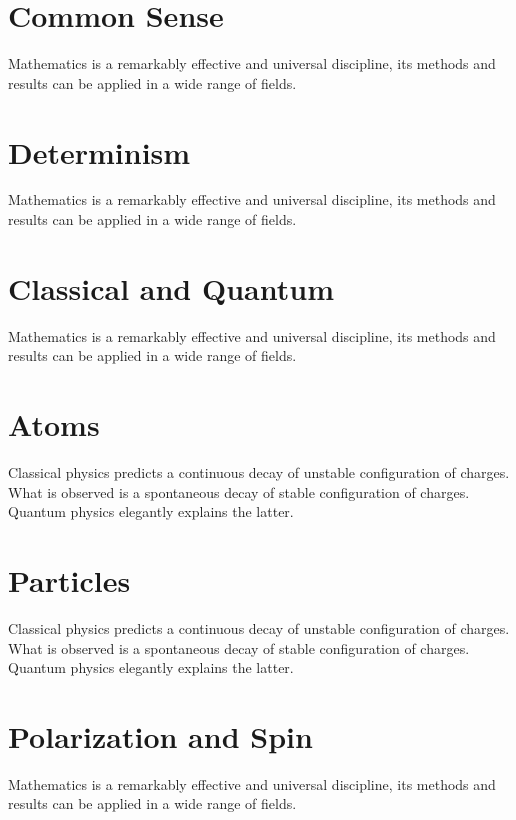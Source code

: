 \section{Common Sense}
Mathematics is a remarkably effective and universal discipline, its
methods and
results can be applied in a wide range of fields.

\section{Determinism}
Mathematics is a remarkably effective and universal discipline, its
methods and
results can be applied in a wide range of fields.

\section{Classical and Quantum}
Mathematics is a remarkably effective and universal discipline, its
methods and
results can be applied in a wide range of fields.

\section{Atoms}
Classical physics predicts a continuous decay of unstable configuration of charges. What is observed is a spontaneous decay of stable configuration of charges. Quantum physics elegantly explains the latter.  

\section{Particles}
Classical physics predicts a continuous decay of unstable configuration of charges. What is observed is a spontaneous decay of stable configuration of charges. Quantum physics elegantly explains the latter.  

\section{Polarization and Spin}
Mathematics is a remarkably effective and universal discipline, its
methods and
results can be applied in a wide range of fields.

